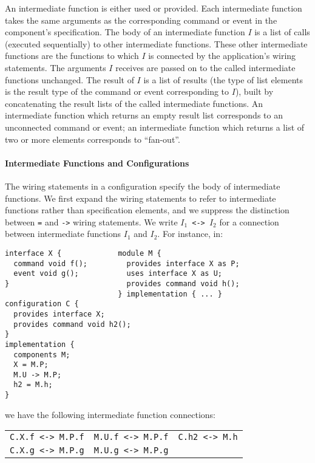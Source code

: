 \documentclass[11pt]{article}
\newcommand{\code}[1]{{\tt #1}}
\begin{document}
An intermediate function is either used or provided. Each intermediate
function takes the same arguments as the corresponding command or event in
the component's specification. The body of an intermediate function $I$ is
a list of calls (executed sequentially) to other intermediate
functions. These other intermediate functions are the functions to which
$I$ is connected by the application's wiring statements. The arguments $I$
receives are passed on to the called intermediate functions unchanged. The
result of $I$ is a list of results (the type of list elements is the result
type of the command or event corresponding to $I$), built by concatenating
the result lists of the called intermediate functions. An intermediate
function which returns an empty result list corresponds to an unconnected
command or event; an intermediate function which returns a list of two or
more elements corresponds to ``fan-out''.

\paragraph{Intermediate Functions and Configurations}

The wiring statements in a configuration specify the body of intermediate
functions. We first expand the wiring statements to refer to intermediate
functions rather than specification elements, and we suppress the
distinction between \code{=} and \code{->} wiring statements. We write
\code{$I_1$ <-> $I_2$} for a connection between intermediate functions
\code{$I_1$} and \code{$I_2$}. For instance, in:
\begin{verbatim}
interface X {             module M {
  command void f();         provides interface X as P;
  event void g();           uses interface X as U;
}                           provides command void h();
                          } implementation { ... }
configuration C {
  provides interface X;
  provides command void h2();
}
implementation {
  components M;
  X = M.P;
  M.U -> M.P;
  h2 = M.h;
}  
\end{verbatim}
we have the following intermediate function connections:\\
\begin{tabular}{ccc}
\code{C.X.f <-> M.P.f} & \code{M.U.f <-> M.P.f} & \code{C.h2 <-> M.h} \\
\code{C.X.g <-> M.P.g} & \code{M.U.g <-> M.P.g}
\end{tabular}
\end{document}
